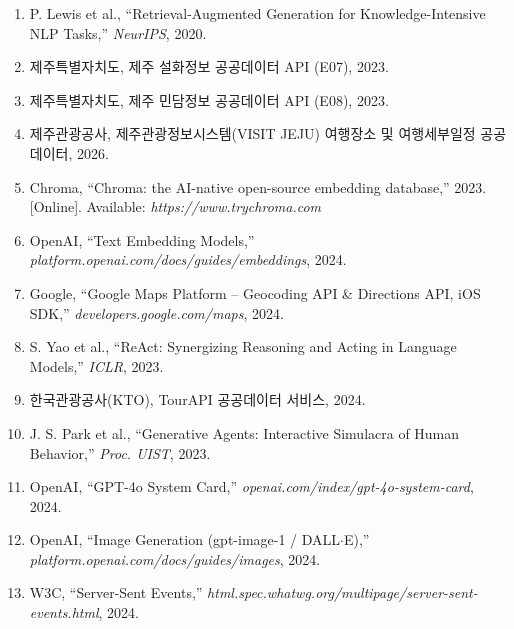 \documentclass[10pt,twocolumn,a4paper]{article}
\begin{document}
\begin{small}
\begin{enumerate}
\setlength{\itemsep}{1pt}
\item P. Lewis et al., ``Retrieval-Augmented Generation for
  Knowledge-Intensive NLP Tasks,'' \textit{NeurIPS}, 2020.
\item 제주특별자치도, 제주 설화정보 공공데이터 API (E07), 2023.
\item 제주특별자치도, 제주 민담정보 공공데이터 API (E08), 2023.
\item 제주관광공사, 제주관광정보시스템(VISIT JEJU) 여행장소 및
  여행세부일정 공공데이터, 2026.
\item Chroma, ``Chroma: the AI-native open-source embedding database,''
  2023. [Online]. Available: \textit{https://www.trychroma.com}
\item OpenAI, ``Text Embedding Models,''
  \textit{platform.openai.com/docs/guides/embeddings}, 2024.
\item Google, ``Google Maps Platform -- Geocoding API \& Directions
  API, iOS SDK,'' \textit{developers.google.com/maps}, 2024.
\item S. Yao et al., ``ReAct: Synergizing Reasoning and Acting in
  Language Models,'' \textit{ICLR}, 2023.
\item 한국관광공사(KTO), TourAPI 공공데이터 서비스, 2024.
\item J. S. Park et al., ``Generative Agents: Interactive Simulacra of
  Human Behavior,'' \textit{Proc. UIST}, 2023.
\item OpenAI, ``GPT-4o System Card,''
  \textit{openai.com/index/gpt-4o-system-card}, 2024.
\item OpenAI, ``Image Generation (gpt-image-1 / DALL$\cdot$E),''
  \textit{platform.openai.com/docs/guides/images}, 2024.
\item W3C, ``Server-Sent Events,''
  \textit{html.spec.whatwg.org/multipage/server-sent-events.html}, 2024.
\end{enumerate}
\end{small}
\end{document}
